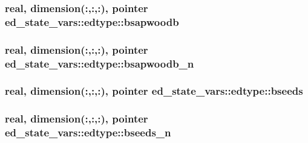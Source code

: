 \subsubsection[{\texorpdfstring{bsapwoodb}{bsapwoodb}}]{\setlength{\rightskip}{0pt plus 5cm}real, dimension(\+:,\+:,\+:), pointer ed\+\_\+state\+\_\+vars\+::edtype\+::bsapwoodb}\hypertarget{structed__state__vars_1_1edtype_a617c8eafa90489182af4a835c19c9ddc}{}\label{structed__state__vars_1_1edtype_a617c8eafa90489182af4a835c19c9ddc}
\subsubsection[{\texorpdfstring{bsapwoodb\+\_\+n}{bsapwoodb_n}}]{\setlength{\rightskip}{0pt plus 5cm}real, dimension(\+:,\+:,\+:), pointer ed\+\_\+state\+\_\+vars\+::edtype\+::bsapwoodb\+\_\+n}\hypertarget{structed__state__vars_1_1edtype_a8db3f05f1867f06a447001bb6bd3b77c}{}\label{structed__state__vars_1_1edtype_a8db3f05f1867f06a447001bb6bd3b77c}
\subsubsection[{\texorpdfstring{bseeds}{bseeds}}]{\setlength{\rightskip}{0pt plus 5cm}real, dimension(\+:,\+:,\+:), pointer ed\+\_\+state\+\_\+vars\+::edtype\+::bseeds}\hypertarget{structed__state__vars_1_1edtype_a24c896b774b8c586a0caab64cd2e9f90}{}\label{structed__state__vars_1_1edtype_a24c896b774b8c586a0caab64cd2e9f90}
\subsubsection[{\texorpdfstring{bseeds\+\_\+n}{bseeds_n}}]{\setlength{\rightskip}{0pt plus 5cm}real, dimension(\+:,\+:,\+:), pointer ed\+\_\+state\+\_\+vars\+::edtype\+::bseeds\+\_\+n}\hypertarget{structed__state__vars_1_1edtype_abbb79aeecf03d2e2fed3b1a9f20a9bbb}{}\label{structed__state__vars_1_1edtype_abbb79aeecf03d2e2fed3b1a9f20a9bbb}
